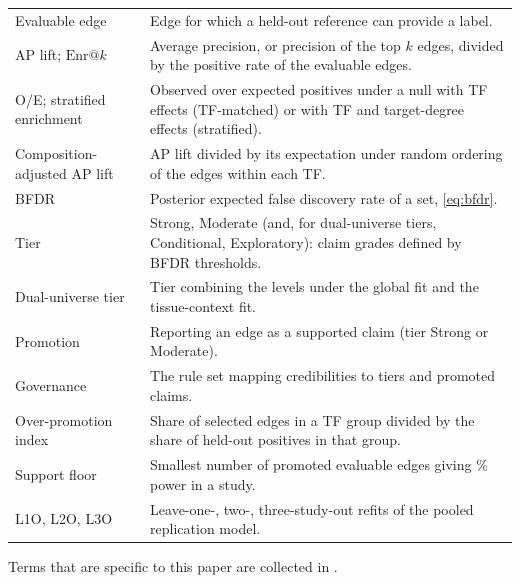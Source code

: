 \begin{table}[!t]
\begin{tabular}{@{}p{}p{}@{}}
    Evaluable edge & Edge for which a held-out reference can provide a label. \\
    AP lift; $\mathrm{Enr}@k$ & Average precision, or precision of the top $k$ edges, divided by the positive rate of the evaluable edges. \\
    O/E; stratified enrichment & Observed over expected positives under a null with TF effects (TF-matched) or with TF and target-degree effects (stratified). \\
    Composition-adjusted AP lift & AP lift divided by its expectation under random ordering of the edges within each TF. \\
    BFDR & Posterior expected false discovery rate of a set, \cref{eq:bfdr}. \\
    Tier & Strong, Moderate (and, for dual-universe tiers, Conditional, Exploratory): claim grades defined by BFDR thresholds. \\
    Dual-universe tier & Tier combining the levels under the global fit and the tissue-context fit. \\
    Promotion & Reporting an edge as a supported claim (tier Strong or Moderate). \\
    Governance & The rule set mapping credibilities to tiers and promoted claims. \\
    Over-promotion index & Share of selected edges in a TF group divided by the share of held-out positives in that group. \\
    Support floor & Smallest number of promoted evaluable edges giving \nRepPowerPct{}\% power in a study. \\
    L1O, L2O, L3O & Leave-one-, two-, three-study-out refits of the pooled replication model. \\
    \bottomrule
  \end{tabular}
\end{table}

Terms that are specific to this paper are collected in .


